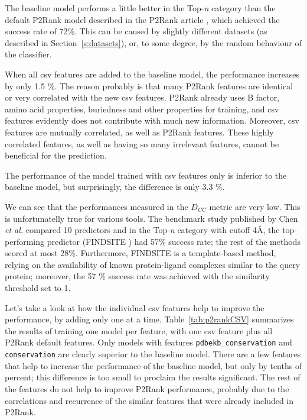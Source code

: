 The baseline model performs a little better in the Top-\textit{n} category than the default P2Rank model described in the P2Rank article \cite{p2rank1}, which achieved the success rate of 72\%. This can be caused by slightly different datasets (as described in Section~\ref{s:datasets}), or, to some degree, by the random behaviour of the classifier.

When all csv features are added to the baseline model, the performance increases by only 1.5 \%. The reason probably is that many P2Rank features are identical or very correlated with the new csv features. P2Rank already uses B factor, amino acid properties, buriedness and other properties for training, and csv features evidently does not contribute with much new information. Moreover, csv features are mutually correlated, as well as P2Rank features. These highly correlated features, as well as having so many irrelevant features, cannot be beneficial for the prediction.

The performance of the model trained with csv features only is inferior to the baseline model, but surprisingly, the difference is only 3.3 \%.

We can see that the performances measured in the $D_{CC}$ metric are very low. This is unfortunatelly true for various tools. The benchmark study published by Chen \textit{et al.} \cite{benchmark} compared 10 predictors and in the Top-\textit{n} category with cutoff 4{\AA}, the top-performing predictor (FINDSITE \cite{findsite}) had 57\% success rate; the rest of the methods scored at most 28\%. Furthermore, FINDSITE is a template-based method, relying on the availability of known protein-ligand complexes similar to the query protein; moreover, the 57 \% success rate was achieved with the similarity threshold set to 1.

Let's take a look at how the individual csv features help to improve the performance, by adding only one at a time. Table~\ref{tab:p2rankCSV} summarizes the results of training one model per feature, with one csv feature plus all P2Rank default features. Only models with features \texttt{pdbekb\_conservation} and \texttt{conservation} are clearly superior to the baseline model. There are a few features that help to increase the performance of the baseline model, but only by tenths of percent; this difference is too small to proclaim the results significant. The rest of the features do not help to improve P2Rank performance, probably due to the correlations and recurrence of the similar features that were already included in P2Rank.

